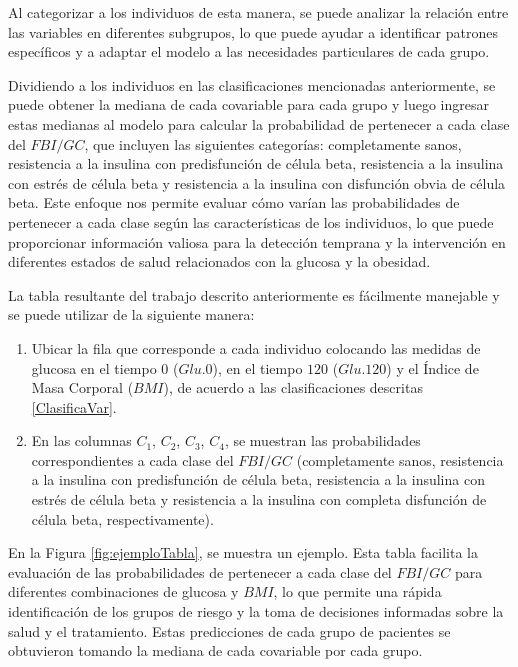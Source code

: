 Al categorizar a los individuos de esta manera, se puede analizar la relación entre las variables en diferentes subgrupos, lo que puede ayudar a identificar patrones específicos y a adaptar el modelo a las necesidades particulares de cada grupo.

Dividiendo a los individuos en las clasificaciones mencionadas anteriormente, se puede obtener la mediana de cada covariable para cada grupo y luego ingresar estas medianas al modelo para calcular la probabilidad de pertenecer a cada clase del $FBI/GC$, que incluyen las siguientes categorías: completamente sanos, resistencia a la insulina con predisfunción de célula beta, resistencia a la insulina con estrés de célula beta y resistencia a la insulina con disfunción obvia de célula beta. Este enfoque nos permite evaluar cómo varían las probabilidades de pertenecer a cada clase según las características de los individuos, lo que puede proporcionar información valiosa para la detección temprana y la intervención en diferentes estados de salud relacionados con la glucosa y la obesidad.

La tabla resultante del trabajo descrito anteriormente es fácilmente manejable y se puede utilizar de la siguiente manera:

\begin{enumerate}
    \item Ubicar la fila que corresponde a cada individuo colocando las medidas de glucosa en el tiempo $0$ ($Glu.0$), en el tiempo $120$ ($Glu.120$) y el Índice de Masa Corporal ($BMI$), de acuerdo a las clasificaciones descritas \ref{ClasificaVar}.

    \item En las columnas $C_1$, $C_2$, $C_3$, $C_4$, se muestran las probabilidades correspondientes a cada clase del $FBI/GC$ (completamente sanos, resistencia a la insulina con predisfunción de célula beta, resistencia a la insulina con estrés de célula beta y resistencia a la insulina con completa disfunción de célula beta, respectivamente).
\end{enumerate}

En la Figura \ref{fig:ejemploTabla}, se muestra un ejemplo. Esta tabla facilita la evaluación de las probabilidades de pertenecer a cada clase del $FBI/GC$ para diferentes combinaciones de glucosa y $BMI$, lo que permite una rápida identificación de los grupos de riesgo y la toma de decisiones informadas sobre la salud y el tratamiento. Estas predicciones de cada grupo de pacientes se obtuvieron tomando la mediana de cada covariable por cada grupo.


